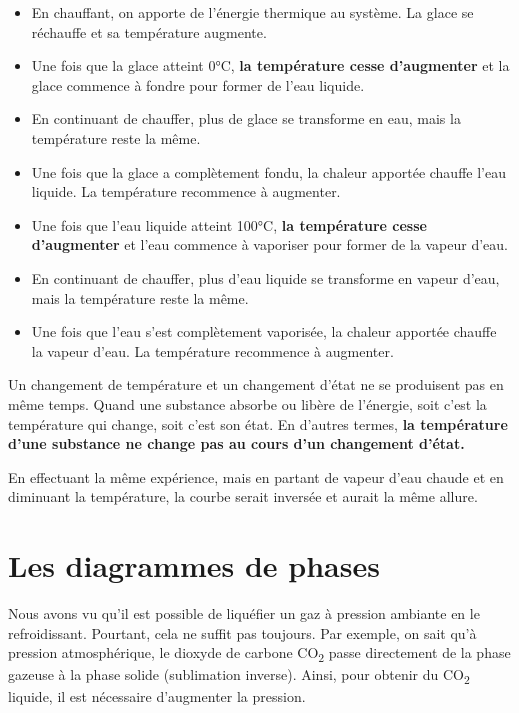 \documentclass[
  11pt,
  a4paper,
  openany]{book}
\providecommand{\tightlist}{%
  \setlength{\itemsep}{0pt}\setlength{\parskip}{0pt}}
\begin{document}
\begin{itemize}
\tightlist
\item
  En chauffant, on apporte de l'énergie thermique au système. La glace se réchauffe et sa température augmente.
\item
  Une fois que la glace atteint 0°C, \textbf{la température cesse d'augmenter} et la glace commence à fondre pour former de l'eau liquide.
\item
  En continuant de chauffer, plus de glace se transforme en eau, mais la température reste la même.
\item
  Une fois que la glace a complètement fondu, la chaleur apportée chauffe l'eau liquide.
  La température recommence à augmenter.
\item
  Une fois que l'eau liquide atteint 100°C, \textbf{la température cesse d'augmenter} et l'eau commence à vaporiser pour former de la vapeur d'eau.
\item
  En continuant de chauffer, plus d'eau liquide se transforme en vapeur d'eau, mais la température reste la même.
\item
  Une fois que l'eau s'est complètement vaporisée, la chaleur apportée chauffe la vapeur d'eau.
  La température recommence à augmenter.
\end{itemize}

Un changement de température et un changement d'état ne se produisent pas en même temps. Quand une substance absorbe ou libère de l'énergie, soit c'est la température qui change, soit c'est son état. En d'autres termes, \textbf{la température d'une substance ne change pas au cours d'un changement d'état.}

En effectuant la même expérience, mais en partant de vapeur d'eau chaude et en diminuant la température, la courbe serait inversée et aurait la même allure.

\section{Les diagrammes de phases}\label{les-diagrammes-de-phases}

Nous avons vu qu'il est possible de liquéfier un gaz à pression ambiante en le refroidissant. Pourtant, cela ne suffit pas toujours. Par exemple, on sait qu'à pression atmosphérique, le dioxyde de carbone CO\textsubscript{2} passe directement de la phase gazeuse à la phase solide (sublimation inverse). Ainsi, pour obtenir du CO\textsubscript{2} liquide, il est nécessaire d'augmenter la pression.
\end{document}
